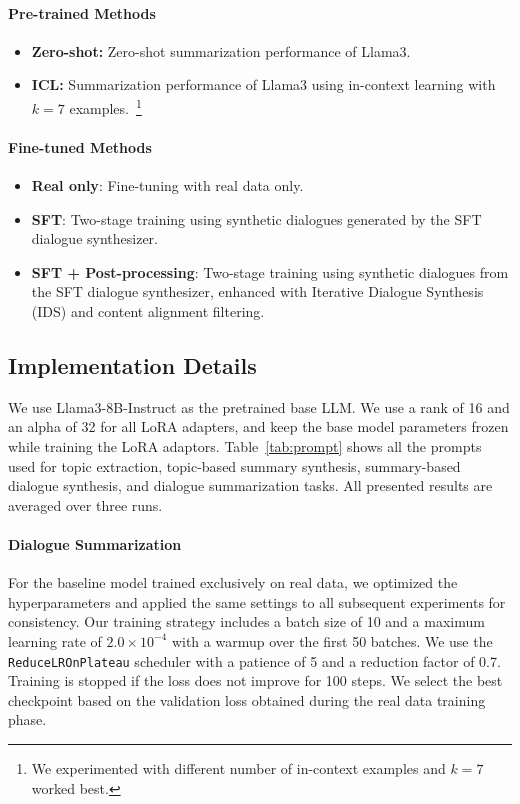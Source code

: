 \paragraph{Pre-trained Methods}
\begin{itemize} [label=-, topsep=0pt, itemsep=1pt, parsep=0pt, partopsep=0pt]
\item \textbf{Zero-shot:} Zero-shot summarization performance of Llama3. 
\item \textbf{ICL:} Summarization performance of Llama3 using in-context learning with $k=7$ examples.~\footnote{We experimented with different number of in-context examples and $k=7$ worked best.}
\end{itemize}
\paragraph{Fine-tuned Methods}
\begin{itemize} [label=-, topsep=0pt, itemsep=1pt, parsep=0pt, partopsep=0pt]
\item \textbf{Real only}: Fine-tuning with real data only.
\item \textbf{SFT}: Two-stage training using synthetic dialogues generated by the SFT dialogue synthesizer.
\item \textbf{SFT + Post-processing}: Two-stage training using synthetic dialogues from the SFT dialogue synthesizer, enhanced with Iterative Dialogue Synthesis (IDS) and content alignment filtering.
\end{itemize}


\subsection{Implementation Details}
We use Llama3-8B-Instruct \citep{dubey2024llama} as the pretrained base LLM. We use a rank of 16 and an alpha of 32 for all LoRA adapters, and keep the base model parameters frozen while training the LoRA adaptors. Table~\ref{tab:prompt} shows all the prompts used for topic extraction, topic-based  summary synthesis, summary-based dialogue synthesis, and dialogue summarization tasks. All presented results are averaged over three runs.

\paragraph{Dialogue Summarization}
For the baseline model trained exclusively on real data, we optimized the hyperparameters and applied the same settings to all subsequent experiments for consistency. Our training strategy includes a batch size of 10 and a maximum learning rate of $2.0 \times 10^{-4}$ with a warmup over the first 50 batches. We use the \texttt{ReduceLROnPlateau} scheduler with a patience of 5 and a reduction factor of 0.7. Training is stopped if the loss does not improve for 100 steps. We select the best checkpoint based on the validation loss obtained during the real data training phase.

